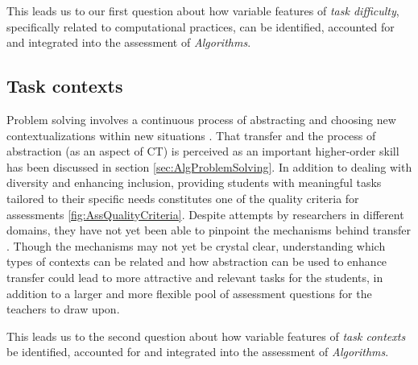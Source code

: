 This leads us to our first question about how variable features of \emph{task difficulty}, specifically related to computational practices, can be identified, accounted for and integrated into the assessment of \emph{Algorithms}.



\subsection*{Task contexts}
Problem solving involves a continuous process of abstracting and choosing new contextualizations within new situations \cite{oers2004recontextualization}. That transfer and the process of abstraction (as an aspect of CT) is perceived as an important higher-order skill has been discussed in section \ref{sec:AlgProblemSolving}. In addition to dealing with diversity and enhancing inclusion, providing students with meaningful tasks tailored to their specific needs constitutes one of the quality criteria for assessments \ref{fig:AssQualityCriteria}. Despite attempts by researchers in different domains, they have not yet been able to pinpoint the mechanisms behind transfer \cite{oers2004recontextualization}. Though the mechanisms may not yet be crystal clear, understanding which types of contexts can be related and how abstraction can be used to enhance transfer could lead to more attractive and relevant tasks for the students, in addition to a larger and more flexible pool of assessment questions for the teachers to draw upon.

This leads us to the second question about how variable features of \emph{task contexts} be identified, accounted for and integrated into the assessment of \emph{Algorithms}.




